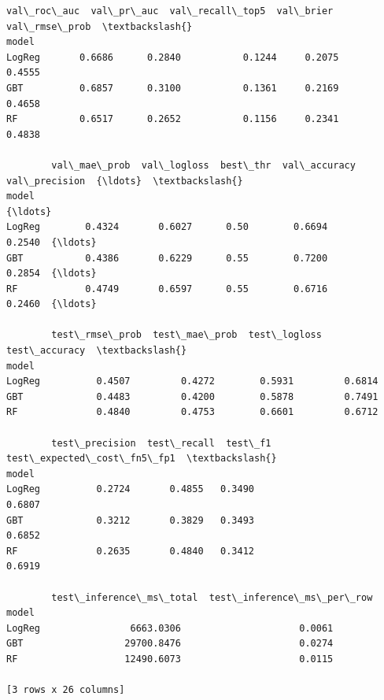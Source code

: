 \documentclass[11pt]{article}
\begin{document}
    
    \begin{Verbatim}[commandchars=\\\{\}]
        val\_roc\_auc  val\_pr\_auc  val\_recall\_top5  val\_brier  val\_rmse\_prob  \textbackslash{}
model                                                                        
LogReg       0.6686      0.2840           0.1244     0.2075         0.4555   
GBT          0.6857      0.3100           0.1361     0.2169         0.4658   
RF           0.6517      0.2652           0.1156     0.2341         0.4838   

        val\_mae\_prob  val\_logloss  best\_thr  val\_accuracy  val\_precision  {\ldots}  \textbackslash{}
model                                                                     {\ldots}   
LogReg        0.4324       0.6027      0.50        0.6694         0.2540  {\ldots}   
GBT           0.4386       0.6229      0.55        0.7200         0.2854  {\ldots}   
RF            0.4749       0.6597      0.55        0.6716         0.2460  {\ldots}   

        test\_rmse\_prob  test\_mae\_prob  test\_logloss  test\_accuracy  \textbackslash{}
model                                                                
LogReg          0.4507         0.4272        0.5931         0.6814   
GBT             0.4483         0.4200        0.5878         0.7491   
RF              0.4840         0.4753        0.6601         0.6712   

        test\_precision  test\_recall  test\_f1  test\_expected\_cost\_fn5\_fp1  \textbackslash{}
model                                                                      
LogReg          0.2724       0.4855   0.3490                      0.6807   
GBT             0.3212       0.3829   0.3493                      0.6852   
RF              0.2635       0.4840   0.3412                      0.6919   

        test\_inference\_ms\_total  test\_inference\_ms\_per\_row  
model                                                       
LogReg                6663.0306                     0.0061  
GBT                  29700.8476                     0.0274  
RF                   12490.6073                     0.0115  

[3 rows x 26 columns]
    \end{Verbatim}
\end{document}
